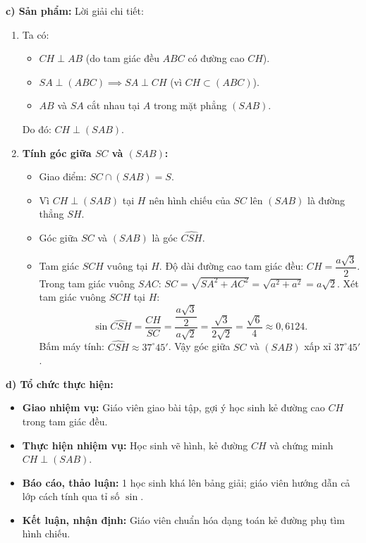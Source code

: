 \documentclass[12pt, a4paper]{article}
\begin{document}
\noindent \textbf{c) Sản phẩm:}
Lời giải chi tiết:
\begin{enumerate}[leftmargin=0.6cm]
    \item Ta có:
    \begin{itemize}
        \item $CH \perp AB$ (do tam giác đều $ABC$ có đường cao $CH$).
        \item $SA \perp (ABC) \implies SA \perp CH$ (vì $CH \subset (ABC)$).
        \item $AB$ và $SA$ cắt nhau tại $A$ trong mặt phẳng $(SAB)$.
    \end{itemize}
    Do đó: $CH \perp (SAB)$.
    \item \textbf{Tính góc giữa $SC$ và $(SAB)$:}
    \begin{itemize}
        \item Giao điểm: $SC \cap (SAB) = S$.
        \item Vì $CH \perp (SAB)$ tại $H$ nên hình chiếu của $SC$ lên $(SAB)$ là đường thẳng $SH$.
        \item Góc giữa $SC$ và $(SAB)$ là góc $\widehat{CSH}$.
        \item Tam giác $SCH$ vuông tại $H$.
        Độ dài đường cao tam giác đều: $CH = \dfrac{a\sqrt{3}}{2}$.
        Trong tam giác vuông $SAC$: $SC = \sqrt{SA^2 + AC^2} = \sqrt{a^2 + a^2} = a\sqrt{2}$.
        Xét tam giác vuông $SCH$ tại $H$:
        $$\sin \widehat{CSH} = \dfrac{CH}{SC} = \dfrac{\dfrac{a\sqrt{3}}{2}}{a\sqrt{2}} = \dfrac{\sqrt{3}}{2\sqrt{2}} = \dfrac{\sqrt{6}}{4} \approx 0{,}6124.$$
        Bấm máy tính: $\widehat{CSH} \approx 37^\circ 45'$.
        Vậy góc giữa $SC$ và $(SAB)$ xấp xỉ $37^\circ 45'$.
    \end{itemize}
\end{enumerate}

\noindent \textbf{d) Tổ chức thực hiện:}
\begin{itemize}[leftmargin=0.6cm]
    \item \textbf{Giao nhiệm vụ:} Giáo viên giao bài tập, gợi ý học sinh kẻ đường cao $CH$ trong tam giác đều.
    \item \textbf{Thực hiện nhiệm vụ:} Học sinh vẽ hình, kẻ đường $CH$ và chứng minh $CH \perp (SAB)$.
    \item \textbf{Báo cáo, thảo luận:} 1 học sinh khá lên bảng giải; giáo viên hướng dẫn cả lớp cách tính qua tỉ số $\sin$.
    \item \textbf{Kết luận, nhận định:} Giáo viên chuẩn hóa dạng toán kẻ đường phụ tìm hình chiếu.
\end{itemize}
\end{document}
